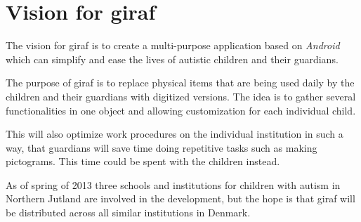 \section{Vision for \acs{giraf}}
The vision for \ac{giraf} is to create a multi-purpose application based on \emph{Android} which can simplify and ease the lives of autistic children and their guardians.

The purpose of \ac{giraf} is to replace physical items that are being used daily by the children and their guardians with digitized versions. The idea is to gather several functionalities in one object and allowing customization for each individual child.

This will also optimize work procedures on the individual institution in such a way, that guardians will save time doing repetitive tasks such as making pictograms. This time could be spent with the children instead.

As of spring of 2013 three schools and institutions for children with autism in Northern Jutland are involved in the development, but the hope is that \ac{giraf} will be distributed across all similar institutions in Denmark.
